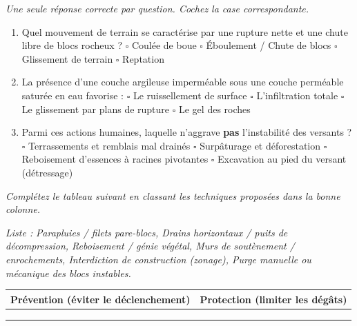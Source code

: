 \documentclass[11pt]{article}
\begin{document}
\begin{exercice}
\emph{Une seule réponse correcte par question. Cochez la case correspondante.}

\begin{enumerate}
    \item Quel mouvement de terrain se caractérise par une rupture nette et une chute libre de blocs rocheux ?
    $\square$ Coulée de boue \quad $\square$ Éboulement / Chute de blocs \quad $\square$ Glissement de terrain \quad $\square$ Reptation
    \item La présence d'une couche argileuse imperméable sous une couche perméable saturée en eau favorise :
    $\square$ Le ruissellement de surface \quad $\square$ L'infiltration totale \quad $\square$ Le glissement par plans de rupture \quad $\square$ Le gel des roches
    \item Parmi ces actions humaines, laquelle n'aggrave \textbf{pas} l'instabilité des versants ?
    $\square$ Terrassements et remblais mal drainés \quad $\square$ Surpâturage et déforestation \quad $\square$ Reboisement d'essences à racines pivotantes \quad $\square$ Excavation au pied du versant (détressage)
\end{enumerate}
\end{exercice}

\begin{exercice}
\emph{Complétez le tableau suivant en classant les techniques proposées dans la bonne colonne.}

\textit{Liste :} \textit{Parapluies / filets pare-blocs, Drains horizontaux / puits de décompression, Reboisement / génie végétal, Murs de soutènement / enrochements, Interdiction de construction (zonage), Purge manuelle ou mécanique des blocs instables.}

\begin{tabular}{|p{5.5cm}|p{5.5cm}|}
\hline
\textbf{Prévention (éviter le déclenchement)} & \textbf{Protection (limiter les dégâts)} \\
\hline
\multicolumn{2}{|c|}{}\\
\multicolumn{2}{|c|}{}\\
\multicolumn{2}{|c|}{}\\
\hline
\end{tabular}
\end{exercice}
\end{document}
